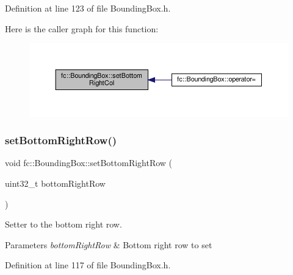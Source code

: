 Definition at line 123 of file Bounding\+Box.\+h.

Here is the caller graph for this function\+:
\nopagebreak
\begin{figure}[H]
\begin{center}
\leavevmode
\includegraphics[width=350pt]{db/dc1/classfc_1_1BoundingBox_af24b7c088410245b0aa492cf0b200e2e_icgraph}
\end{center}
\end{figure}
\mbox{\label{classfc_1_1BoundingBox_a88812242713670dc43c3137b0a962cbe}} 
\subsubsection{\texorpdfstring{set\+Bottom\+Right\+Row()}{setBottomRightRow()}}
{\footnotesize\ttfamily void fc\+::\+Bounding\+Box\+::set\+Bottom\+Right\+Row (\begin{DoxyParamCaption}\item[{uint32\+\_\+t}]{bottom\+Right\+Row }\end{DoxyParamCaption})\hspace{0.3cm}{\ttfamily [inline]}}



Setter to the bottom right row. 


\begin{DoxyParams}{Parameters}
{\em bottom\+Right\+Row} & Bottom right row to set \\
\hline
\end{DoxyParams}


Definition at line 117 of file Bounding\+Box.\+h.

